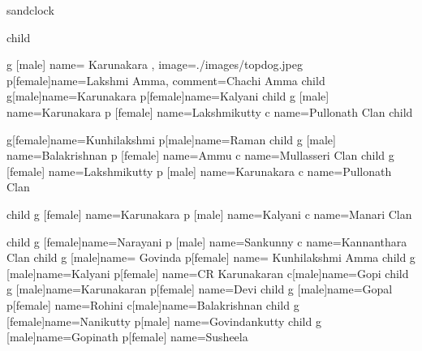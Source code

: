\documentclass{article}
\begin{document}
\begin{landscape}
\begin{genealogypicture} [
processing=database,
database format=medium marriage below,
node size=2.4cm,
level size=3.5cm,
level distance=6mm,
list separators hang,
name font=\bfseries,
surn code={\textcolor{red!50!black}{#1}},
place text={\newline}{},
date format=d/mon/yyyy,
tcbset={male/.style={colframe=blue,colback=blue!5},
female/.style={colframe=red,colback=red!5}},
box={fit basedim=7pt,boxsep=2pt,segmentation style=solid,
halign=left,before upper=\parskip1pt,
\gtrDBsex,drop fuzzy shadow,
if image defined={add to width=25mm,right=25mm,
underlay={\begin{tcbclipinterior}\path[fill overzoom DBimage]
([xshift=-24mm]interior.south east) rectangle (interior.north east);
\end{tcbclipinterior}},
}{},
},
]

sandclock {
	child {
  		g [male]  {name={ Karunakara }, image={./images/topdog.jpeg}}
  		p[female]{name={Lakshmi Amma}, comment={Chachi Amma}}
  		child {
  			 g[male]{name=Karunakara }
   			p[female]{name={Kalyani}}
   			child {
    				g [male] {name=Karunakara }
    				p [female] {name=Lakshmikutty }
				c {name=Pullonath Clan}
   			}
  		}
  		child {
   			g[female]{name={Kunhilakshmi }}
   			p[male]{name={Raman }}
   			child {
    				g [male] {name=Balakrishnan }
    				p [female] {name=Ammu}
				c {name=Mullasseri Clan}
   			}
			child {
    				g [female] {name=Lakshmikutty }
				p [male] {name=Karunakara }
				c {name=Pullonath Clan}
   			}

			child {
    				g [female] {name=Karunakara }
				p [male] {name=Kalyani}
				c {name=Manari Clan}
   			}
  		}
  		child {
   			g [female]{name={Narayani }}
   			p [male] {name={Sankunny }}
			c {name=Kannanthara Clan}
  		}
  		child {
   			g [male]{name={ Govinda }}
   			p[female] {name={ Kunhilakshmi Amma}}
			child {
   				g [male]{name=Kalyani}
   				p[female] {name=CR Karunakaran}
  			}
			c[male]{name=Gopi}
			child {
   				g [male]{name=Karunakaran}
   				p[female] {name=Devi}
  			}
			child {
   				g [male]{name=Gopal}
   				p[female] {name=Rohini}
  			}
			c[male]{name=Balakrishnan}
			child {
   				g [female]{name=Nanikutty}
   				p[male] {name=Govindankutty}
  			}
			child {
   				g [male]{name=Gopinath}
   				p[female] {name=Susheela}
  			}
  		}
	}
}

\end{genealogypicture}

\end{landscape}
\end{document}
